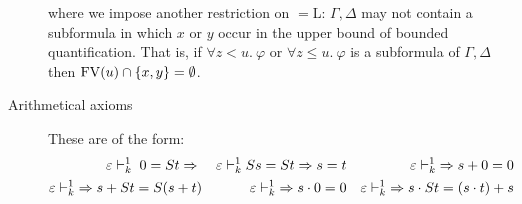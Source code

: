 \begin{description}
\begin{mathpar}

  \end{mathpar}
  where we impose another restriction on $=$L: $\Gamma, \Delta$ may not contain
  a subformula in which $x$ or $y$ occur in the upper bound of bounded
  quantification. That is, if $\forall z < u.~\varphi$ or $\forall z \leq
  u.~\varphi$ is a subformula of $\Gamma, \Delta$ then $\FV(u) \cap \{x, y\} = \emptyset$.
  \item [Arithmetical axioms] These are of the form: 
  \begin{align*}
    \varepsilon \vdash^{1}_{k} \;  0 = S t \sdash ~ & & \varepsilon \vdash^{1}_{k} S s = S t \sdash s = t && \varepsilon \vdash^{1}_{k} \; \sdash s + 0 = 0 \\
    \varepsilon \vdash^{1}_{k} \; \sdash s + St = S(s + t) && \varepsilon \vdash^{1}_{k} \; \sdash s \cdot 0 = 0 &&\varepsilon \vdash^{1}_{k} \; \sdash s \cdot St = (s \cdot t) + s
  \end{align*}
\end{description}

